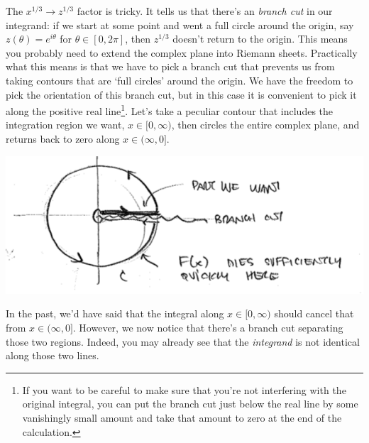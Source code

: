 \documentclass[
  11pt,
	colorful,
	raggedright,
]{tufte-style-thesis-flip}
\begin{document}
  The $x^{1/3} \to z^{1/3}$ factor is tricky. It tells us that there's an \emph{branch cut} in our integrand: if we start at some point and went a full circle around the origin, say $z(\theta) = e^{i\theta}$ for $\theta\in[0,2\pi]$, then $z^{1/3}$ doesn't return to the origin. This means you probably need to extend the complex plane into Riemann sheets. Practically what this means is that we have to pick a branch cut that prevents us from taking contours that are `full circles' around the origin. We have the freedom to pick the orientation of this branch cut, but in this case it is convenient to pick it along the positive real line\footnote{If you want to be careful to make sure that you're not interfering with the original integral, you can put the branch cut just below the real line by some vanishingly small amount and take that amount to zero at the end of the calculation.}. Let's take a peculiar contour that includes the integration region we want, $x\in [0,\infty)$, then circles the entire complex plane, and returns back to zero along $x\in (\infty, 0]$. 
 \begin{center}
 \includegraphics[width=.8\textwidth]{figures/Lec_2017_14_branch.png}
 \end{center}
 In the past, we'd have said that the integral along $x\in [0, \infty)$ should cancel that from $x\in (\infty, 0]$. However, we now notice that there's a branch cut separating those two regions. Indeed, you may already see that the \emph{integrand} is not identical along those two lines. 
\end{document}

